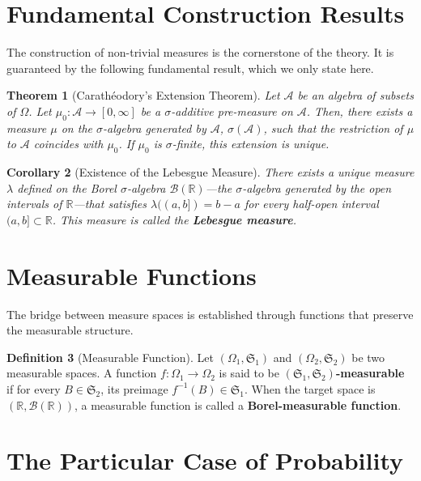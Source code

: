 \documentclass[12pt, openany]{book}
\theoremstyle{definition}
\newtheorem{definition}{Definition}[section]
\theoremstyle{plain}
\newtheorem{theorem}[definition]{Theorem}
\newtheorem{corollary}[definition]{Corollary}
\theoremstyle{remark}
\newcommand{\R}{\mathbb{R}}
\newcommand{\B}{\mathcal{B}}
\newcommand{\germS}{\mathfrak{S}} %
\begin{document}
\section*{Fundamental Construction Results}

The construction of non-trivial measures is the cornerstone of the theory. It is guaranteed by the following fundamental result, which we only state here.

\begin{theorem}[Carathéodory's Extension Theorem]
Let $\mathcal{A}$ be an algebra of subsets of $\Omega$. Let $\mu_0: \mathcal{A} \to [0, \infty]$ be a $\sigma$-additive pre-measure on $\mathcal{A}$. Then, there exists a measure $\mu$ on the $\sigma$-algebra generated by $\mathcal{A}$, $\sigma(\mathcal{A})$, such that the restriction of $\mu$ to $\mathcal{A}$ coincides with $\mu_0$. If $\mu_0$ is $\sigma$-finite, this extension is unique.
\end{theorem}

\begin{corollary}[Existence of the Lebesgue Measure]
There exists a unique measure $\lambda$ defined on the Borel $\sigma$-algebra $\B(\R)$—the $\sigma$-algebra generated by the open intervals of $\R$—that satisfies $\lambda((a, b]) = b-a$ for every half-open interval $(a, b] \subset \R$. This measure is called the \textbf{Lebesgue measure}.
\end{corollary}

\section*{Measurable Functions}

The bridge between measure spaces is established through functions that preserve the measurable structure.

\begin{definition}[Measurable Function]
Let $(\Omega_1, \germS_1)$ and $(\Omega_2, \germS_2)$ be two measurable spaces. A function $f: \Omega_1 \to \Omega_2$ is said to be \textbf{$(\germS_1, \germS_2)$-measurable} if for every $B \in \germS_2$, its preimage $f^{-1}(B) \in \germS_1$.
When the target space is $(\R, \B(\R))$, a measurable function is called a \textbf{Borel-measurable function}.
\end{definition}

\section*{The Particular Case of Probability}
\end{document}
